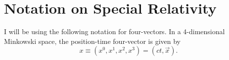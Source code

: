
\section{Notation on Special Relativity}

I will be using the following notation for four-vectors. In a 4-dimensional Minkowski space, the position-time four-vector is given by \cite[198]{Ulrik}
\begin{equation}
x \equiv (x^0,x^1,x^2,x^3)=(ct,\vec{x}).
\end{equation}



